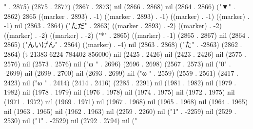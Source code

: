 " . 2875) (2875 . 2877) (2867 . 2873) nil (2866 . 2868) nil (2864 . 2866) ("▼" . 2862) 2865 ((marker . 2893) . -1) ((marker . 2893) . -1) ((marker) . -1) ((marker) . -1) nil (2863 . 2864) ("ただ" . 2863) ((marker . 2893) . -2) ((marker) . -2) ((marker) . -2) ((marker) . -2) ("*" . 2865) ((marker) . -1) (2865 . 2867) nil (2864 . 2865) ("んいげん" . 2864) ((marker) . -4) nil (2863 . 2868) ("た" . -2863) (2862 . 2864) (t 21383 6224 784402 856000) nil (2425 . 2426) nil (2423 . 2426) nil (2575 . 2576) nil (2573 . 2576) nil ("ω
" . 2696) (2696 . 2698) (2567 . 2573) nil ("0" . -2699) nil (2699 . 2700) nil (2693 . 2699) nil ("ω
" . 2559) (2559 . 2561) (2417 . 2423) nil ("ω
" . 2414) (2414 . 2416) (2285 . 2291) nil (1981 . 1982) nil (1979 . 1982) nil (1978 . 1979) nil (1976 . 1978) nil (1974 . 1975) nil (1972 . 1975) nil (1971 . 1972) nil (1969 . 1971) nil (1967 . 1968) nil (1965 . 1968) nil (1964 . 1965) nil (1963 . 1965) nil (1962 . 1963) nil (2259 . 2260) nil ("1" . -2259) nil (2529 . 2530) nil ("1" . -2529) nil (2792 . 2794) nil ("

